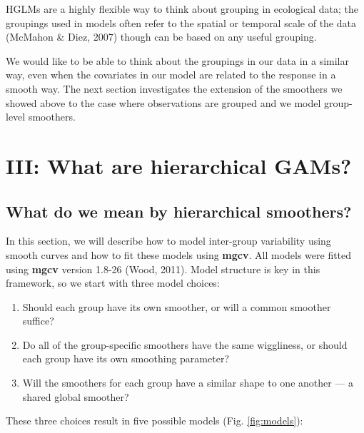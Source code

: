\documentclass[12pt]{article}
\providecommand{\tightlist}{%
  \setlength{\itemsep}{0pt}\setlength{\parskip}{0pt}}
\begin{document}
HGLMs are a highly flexible way to think about grouping in ecological
data; the groupings used in models often refer to the spatial or
temporal scale of the data (McMahon \& Diez, 2007) though can be based
on any useful grouping.

We would like to be able to think about the groupings in our data in a
similar way, even when the covariates in our model are related to the
response in a smooth way. The next section investigates the extension of
the smoothers we showed above to the case where observations are grouped
and we model group-level smoothers. \FloatBarrier

\section{III: What are hierarchical
GAMs?}\label{iii-what-are-hierarchical-gams}

\subsection{What do we mean by hierarchical
smoothers?}\label{what-do-we-mean-by-hierarchical-smoothers}

In this section, we will describe how to model inter-group variability
using smooth curves and how to fit these models using \textbf{mgcv}. All
models were fitted using \textbf{mgcv} version 1.8-26 (Wood, 2011).
Model structure is key in this framework, so we start with three model
choices:

\begin{enumerate}
\def\labelenumi{\arabic{enumi}.}
\tightlist
\item
  Should each group have its own smoother, or will a common smoother
  suffice?
\item
  Do all of the group-specific smoothers have the same wiggliness, or
  should each group have its own smoothing parameter?
\item
  Will the smoothers for each group have a similar shape to one another
  --- a shared global smoother?
\end{enumerate}

These three choices result in five possible models (Fig.
\ref{fig:models}):
\end{document}

